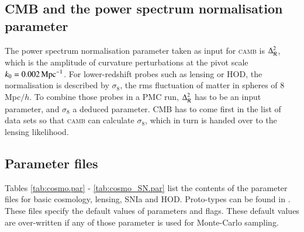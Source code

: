 \documentclass[11pt, chapterprefix, headsepline]{scrartcl}
\begin{document}
\subsection{CMB  and the power spectrum normalisation parameter}
\label{sec:cmb_sigma8}

The power spectrum normalisation parameter taken as input for
\textsc{camb} is $\Delta_{\cal R}^2$, which is the amplitude of
curvature perturbations at the pivot scale $k_0 = 0.002\,
\rm{Mpc}^{-1}$. For lower-redshift probes such as lensing or HOD,
the
normalisation is described by $\sigma_8$, the rms fluctuation of
matter in spheres of 8 Mpc$/h$. To combine those probes in a PMC run,
$\Delta_{\cal R}^2$ has to be an input parameter, and $\sigma_8$ a
deduced parameter. CMB has to come first in the list of data sets so
that \textsc{camb} can calculate $\sigma_8$, which in turn is handed
over to the lensing %
 likelihood.


\subsection{Parameter files}
\label{sec:par_files}

Tables \ref{tab:cosmo.par} - \ref{tab:cosmo_SN.par} list the contents
of the parameter files for basic cosmology,
lensing, SNIa and HOD. Proto-types can be found in
.  These files specify the default
values of parameters and flags. These default values are over-written if any
of those parameter is used for Monte-Carlo sampling.
\end{document}
